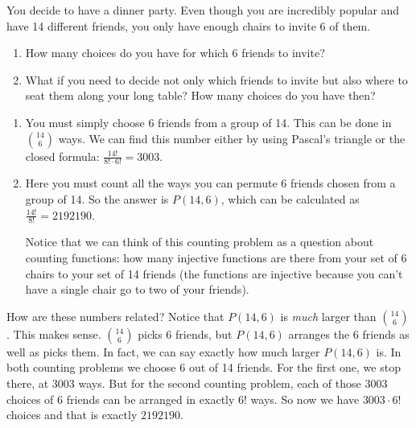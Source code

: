 \documentclass[11pt,]{book}
\theoremstyle{ptxplainnotitle}
\theoremstyle{ptxplaintitle}
\theoremstyle{ptxdefinitionnotitle}
\theoremstyle{ptxdefinitiontitle}
\theoremstyle{ptxdefinitionnotitle}
\theoremstyle{ptxdefinitiontitle}
\theoremstyle{ptxdefinitionnotitle}
\theoremstyle{ptxdefinitiontitle}
\theoremstyle{ptxdefinitiontitlenonumber}
\theoremstyle{ptxdefinitiontitlenonumber}
\numberwithin{equation}{chapter}
\begin{document}
\begin{example}\label{example-46}
\hypertarget{p-1482}{}%
You decide to have a dinner party. Even though you are incredibly popular and have 14 different friends, you only have enough chairs to invite 6 of them.%
\par
\hypertarget{p-1483}{}%
\leavevmode%
\begin{enumerate}
\item\hypertarget{li-641}{}\hypertarget{p-1484}{}%
How many choices do you have for which 6 friends to invite?%
\item\hypertarget{li-642}{}\hypertarget{p-1485}{}%
What if you need to decide not only which friends to invite but also where to seat them along your long table?  How many choices do you have then?%
\end{enumerate}
%
\par\smallskip%
\noindent\textbf{}\hypertarget{solution-190}{}\hypertarget{p-1486}{}%
\leavevmode%
\begin{enumerate}
\item\hypertarget{li-643}{}\hypertarget{p-1487}{}%
You must simply choose 6 friends from a group of 14.  This can be done in \({14 \choose 6}\) ways.  We can find this number either by using Pascal's triangle or the closed formula: \(\frac{14!}{8!\cdot 6!} = 3003\).%
\item\hypertarget{li-644}{}\hypertarget{p-1488}{}%
Here you must count all the ways you can permute 6 friends chosen from a group of 14.  So the answer is \(P(14, 6)\), which can be calculated as \(\frac{14!}{8!} = 2192190\).%
\par
\hypertarget{p-1489}{}%
Notice that we can think of this counting problem as a question about counting functions: how many injective functions are there from your set of 6 chairs to your set of 14 friends (the functions are injective because you can't have a single chair go to two of your friends).%
\end{enumerate}
%
\par
\hypertarget{p-1490}{}%
How are these numbers related? Notice that \(P(14,6)\) is \emph{much} larger than \({14 \choose 6}\). This makes sense. \({14 \choose 6}\) picks 6 friends, but \(P(14,6)\) arranges the 6 friends as well as picks them. In fact, we can say exactly how much larger \(P(14,6)\) is. In both counting problems we choose 6 out of 14 friends. For the first one, we stop there, at 3003 ways. But for the second counting problem, each of those 3003 choices of 6 friends can be arranged in exactly \(6!\) ways. So now we have \(3003\cdot 6!\) choices and that is exactly \(2192190\).%

\end{example}
\end{document}
